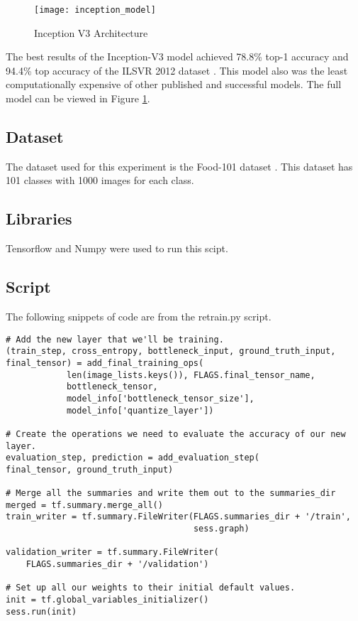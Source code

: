 \begin{figure}
     \texttt{[image: inception\_model]}
     \caption{Inception V3 Architecture}
     \label{fig:inception_model}
\end{figure}

The best results of the Inception-V3 model achieved 78.8\% top-1 accuracy and 94.4\% top accuracy of the ILSVR 2012 dataset \textcite{rethinkingInception}.
This model also was the least computationally expensive of other published and successful models.
The full model can be viewed in Figure \ref{fig:inception_model}.

\subsection*{Dataset}
The dataset used for this experiment is the Food-101 dataset \textcite{food
101}. This dataset has 101 classes with 1000 images for each class.

\subsection*{Libraries}
Tensorflow and Numpy were used to run this scipt.

\subsection*{Script}
The following snippets of code are from the retrain.py script.

\begin{lstlisting}
# Add the new layer that we'll be training.
(train_step, cross_entropy, bottleneck_input, ground_truth_input,
final_tensor) = add_final_training_ops(
            len(image_lists.keys()), FLAGS.final_tensor_name,
            bottleneck_tensor,
            model_info['bottleneck_tensor_size'],
            model_info['quantize_layer'])
 
# Create the operations we need to evaluate the accuracy of our new layer.
evaluation_step, prediction = add_evaluation_step(
final_tensor, ground_truth_input)
 
# Merge all the summaries and write them out to the summaries_dir
merged = tf.summary.merge_all()
train_writer = tf.summary.FileWriter(FLAGS.summaries_dir + '/train',
                                     sess.graph)
 
validation_writer = tf.summary.FileWriter(
    FLAGS.summaries_dir + '/validation')
 
# Set up all our weights to their initial default values.
init = tf.global_variables_initializer()
sess.run(init)

\end{lstlisting}




